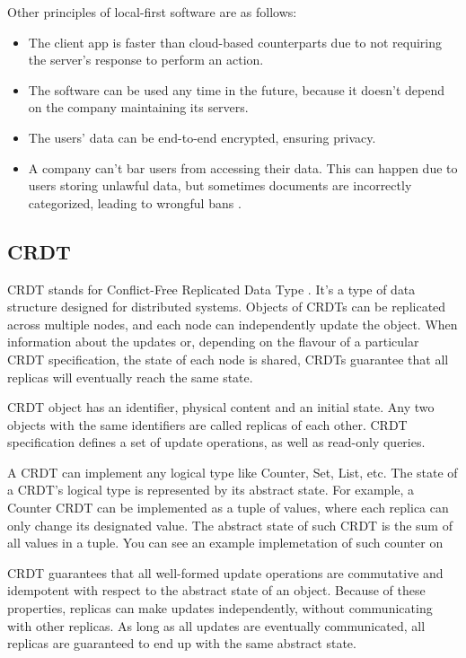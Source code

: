 \documentclass[a4paper, 11pt, oneside]{article}
\theoremstyle{definition}
\begin{document}
Other principles of local-first software are as follows:
\begin{itemize}
    \item The client app is faster than cloud-based counterparts due to not requiring the server's response to perform an action.
    \item The software can be used any time in the future, because it doesn't depend on the company maintaining its servers.
    \item The users' data can be end-to-end encrypted, ensuring privacy.
    \item A company can't bar users from accessing their data. This can happen due to users storing unlawful data, but sometimes documents are incorrectly categorized, leading to wrongful bans \cite{googleblock}.
\end{itemize}

\subsection{CRDT}
CRDT stands for Conflict-Free Replicated Data Type \cite{crdt}. It's a type of data structure designed for distributed systems. Objects of CRDTs can be replicated across multiple nodes, and each node can independently update the object. When information about the updates or, depending on the flavour of a particular CRDT specification, the state of each node is shared, CRDTs guarantee that all replicas will eventually reach the same state.

CRDT object has an identifier, physical content and an initial state. Any two objects with the same identifiers are called replicas of each other. CRDT specification defines a set of update operations, as well as read-only queries.

A CRDT can implement any logical type like Counter, Set, List, etc. The state of a CRDT's logical type is represented by its abstract state. For example, a Counter CRDT can be implemented as a tuple of values, where each replica can only change its designated value. The abstract state of such CRDT is the sum of all values in a tuple. You can see an example implemetation of such counter on 

CRDT guarantees that all well-formed update operations are commutative and idempotent with respect to the abstract state of an object. Because of these properties, replicas can make updates independently, without communicating with other replicas. As long as all updates are eventually communicated, all replicas are guaranteed to end up with the same abstract state.
\end{document}
